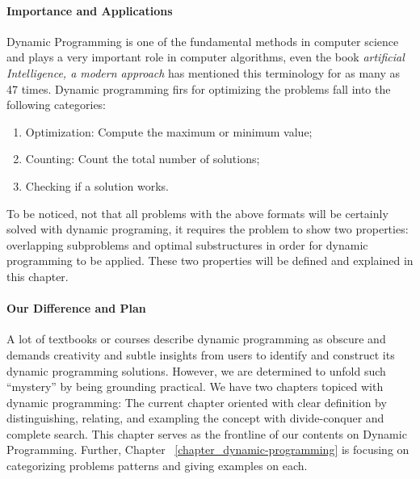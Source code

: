 \documentclass[../main.tex]{subfiles}
\begin{document}
\paragraph{Importance and Applications} Dynamic Programming is one of the fundamental methods in computer science and plays a very important role in computer algorithms, even the book \textit{artificial Intelligence, a modern approach} has mentioned this terminology for as many as 47 times. Dynamic programming firs for optimizing the problems fall into the following categories:
\begin{enumerate}
    \item Optimization: Compute the maximum or minimum value;
    \item Counting: Count the total number of solutions;
    \item Checking if a solution works.
\end{enumerate}
To be noticed, not that all problems with the above formats will be certainly solved with dynamic programing, it requires the problem to show two properties: overlapping subproblems and optimal substructures in order for dynamic programming to be applied. These two properties will be defined and explained in this chapter. 

\paragraph{Our Difference and Plan} A lot of textbooks or courses describe dynamic programming as obscure and demands creativity and subtle insights from users to identify and construct its dynamic programming solutions. However, we are determined to unfold such ``mystery'' by being grounding practical. We have two chapters topiced with dynamic programming: The current chapter oriented with clear definition by distinguishing, relating, and exampling the concept with divide-conquer and complete search. This chapter serves as the frontline of our contents on Dynamic Programming. Further, Chapter ~\ref{chapter_dynamic-programming} is focusing on categorizing problems patterns and giving examples on each. 
\end{document}
